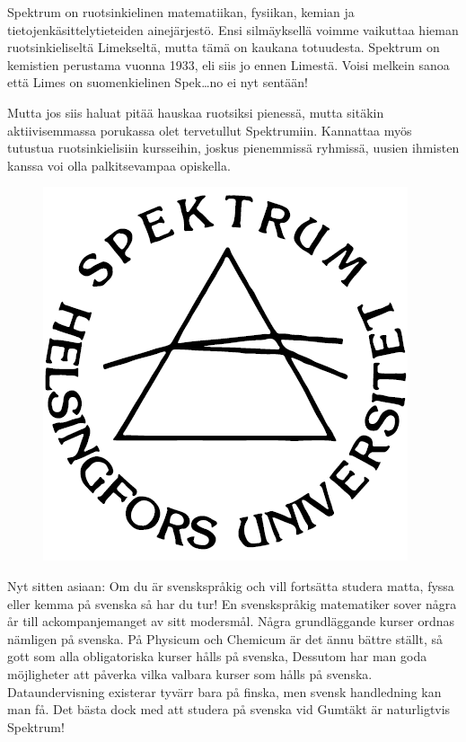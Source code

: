 \documentclass[a5paper, 8pt, twocolumn]{book} %
\numberwithin{equation}{section}
\begin{document}
Spektrum on ruotsinkielinen matematiikan,
fysiikan, kemian ja tietojenkäsittelytieteiden
ainejärjestö. Ensi silmäyksellä
voimme vaikuttaa hieman ruotsinkieliseltä
Limekseltä, mutta tämä on kaukana totuudesta.
Spektrum on kemistien perustama
vuonna 1933, eli siis jo ennen Limestä.
Voisi melkein sanoa että Limes on suomenkielinen
Spek\dots no ei nyt sentään!

Mutta jos siis haluat pitää hauskaa ruotsiksi
pienessä, mutta sitäkin aktiivisemmassa
porukassa olet tervetullut Spektrumiin.
Kannattaa myös tutustua ruotsinkielisiin
kursseihin, joskus pienemmissä ryhmissä,
uusien ihmisten kanssa voi olla palkitsevampaa
opiskella.

\begin{figure}[!b]
	\centering
	\includegraphics[width=\columnwidth]{spektrum.png}
\end{figure}

Nyt sitten asiaan: Om du är svensk\-språkig
och vill fort\-sätta studera matta, fyssa
eller kemma på svenska så har du tur! En
svenskspråkig matematiker sover några år
till ackompanjemanget av sitt moder\-smål.
Några grund\-läggande kurser ordnas nämligen
på svenska. På Physicum och Chemicum
är det ännu bättre ställt, så gott som
alla obligatoriska kurser hålls på svenska,
Dessutom har man goda möjligheter att
påverka vilka valbara kurser som hålls på
svenska. Data\-under\-visning existerar tyvärr
bara på finska, men svensk handledning
kan man få. Det bästa dock med att studera
på svenska vid Gumtäkt är naturligtvis
Spektrum!
\end{document}
